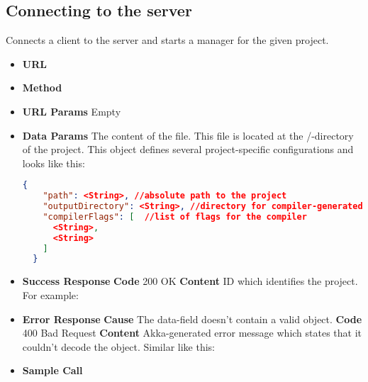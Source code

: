 \subsection{Connecting to the server}
Connects a client to the server and starts a manager for the given project.



\begin{itemize}
\item \textbf{URL} 
\item \textbf{Method} 
\item \textbf{URL Params} Empty
\item \textbf{Data Params}
  The content of the  file. This file is located at the /-directory of the project.
  This object defines several project-specific configurations and looks like this:
  \begin{lstlisting}[basicstyle=\small,language=json]
  {
    "path": <String>, //absolute path to the project
    "outputDirectory": <String>, //directory for compiler-generated files
    "compilerFlags": [  //list of flags for the compiler
      <String>,
      <String>
    ]
  }
  \end{lstlisting}
\item \textbf{Success Response}
  \newline\textbf{Code} 200 OK
  \newline\textbf{Content} ID which identifies the project. For example: 
\item \textbf{Error Response}
  \newline\textbf{Cause} The data-field doesn't contain a valid object.
  \newline\textbf{Code} 400 Bad Request
  \newline\textbf{Content} Akka-generated error message which states that it couldn't decode the
  object. Similar like this: 
  \item \textbf{Sample Call}
\end{itemize}
